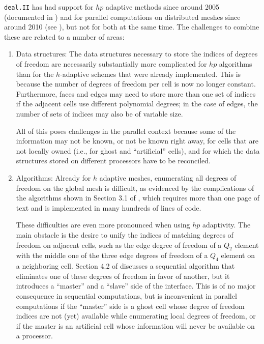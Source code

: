 \documentclass{ansarticle-preprint}
\newcommand{\specialword}[1]{\texttt{#1}}
\newcommand{\dealii}{{\specialword{deal.II}}\xspace}
\begin{document}
\dealii{} has had support for $hp$ adaptive methods since around 2005
(documented in \cite{BangerthKayserHerold2007}) and for parallel
computations on distributed meshes since around 2010 (see
\cite{BangerthBursteddeHeisterKronbichler11}), but not for both at the
same time. The challenges to combine these are related to a number of
areas:
\begin{enumerate}
\item Data structures: The data structures necessary to store the
  indices of degrees of freedom are necessarily substantially more
  complicated for $hp$ algorithms than for the $h$-adaptive schemes
  that were already implemented. This is because the number of degrees
  of freedom per cell is now no longer constant. Furthermore,
  faces and edges may need to store more than one set of indices if
  the adjacent cells use different polynomial degrees; in the case of
  edges, the number of sets of indices may also be of variable size.

  All of this poses challenges in the parallel context because some of
  the information may not be known, or not be known right away, for
  cells that are not locally owned (i.e., for ghost and ``artificial''
  cells), and for which the data structures stored on different
  processors have to be reconciled.

\item Algorithms: Already for $h$ adaptive meshes, enumerating all
  degrees of freedom on the global mesh is difficult, as evidenced by
  the complications of the algorithms shown in Section 3.1 of
  \cite{BangerthBursteddeHeisterKronbichler11}, which requires more
  than one page of text and is implemented in many hundreds of lines of
  code.

  These difficulties are even more pronounced when using $hp$
  adaptivity. The main obstacle is the desire to unify the indices of
  matching degrees of freedom on adjacent cells, such as the edge
  degree of freedom of a $Q_2$ element with the middle one of
  the three edge degrees of freedom of a $Q_4$ element on a
  neighboring cell. Section 4.2 of
  \cite{BangerthKayserHerold2007} discusses a sequential algorithm
  that eliminates one of these degrees of freedom in favor of another,
  but it introduces a ``master'' and a ``slave'' side of the
  interface. This is of no major consequence in sequential
  computations, but is inconvenient in parallel computations if the
  ``master'' side is a ghost cell whose degree of freedom indices are
  not (yet) available while enumerating local degrees of freedom, or
  if the master is an artificial cell whose information will never be
  available on a processor.


\end{enumerate}
\end{document}
